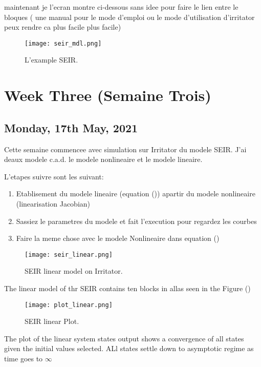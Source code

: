 \documentclass[a4paper, 12pt, notitlepage]{report}
\begin{document}
maintenant je l'ecran montre ci-dessous sans idee pour faire le lien entre le bloques ( une manual pour le mode d'emploi ou le mode d'utilisation d'irritator peux rendre ca plus facile plus facile)

\begin{figure}[htbp]
\centerline{\texttt{[image: seir\_mdl.png]}}
\caption{L'example SEIR.}
\label{fig}
\end{figure}

\section{Week Three (Semaine Trois)}
\subsection{Monday, 17th May, 2021}

Cette semaine commencee avec simulation sur Irritator du modele SEIR. J'ai deaux modele c.a.d. le modele nonlineaire et le modele lineaire.

L'etapes suivre sont les suivant: 

\begin{enumerate}
\item
Etablisement du modele lineaire (equation ()) apartir du modele nonlineaire (linearisation Jacobian)

\item
Sassiez le parametres du modele et fait l'execution pour regardez les courbes

\item
Faire la meme chose avec le modele Nonlineaire dans equation ()
\end{enumerate}

\begin{figure}[htbp]
\centerline{\texttt{[image: seir\_linear.png]}}
\caption{SEIR linear model on Irritator.}
\label{fig}
\end{figure}

The linear model of thr SEIR contains ten blocks in allas seen in the Figure ()

\begin{figure}[htbp]
\centerline{\texttt{[image: plot\_linear.png]}}
\caption{SEIR linear Plot.}
\label{fig}
\end{figure}

The plot of the linear system states output shows a convergence of all states given the initial values selected. ALl states settle down to asymptotic regime as time goes to $\infty$
\end{document}
